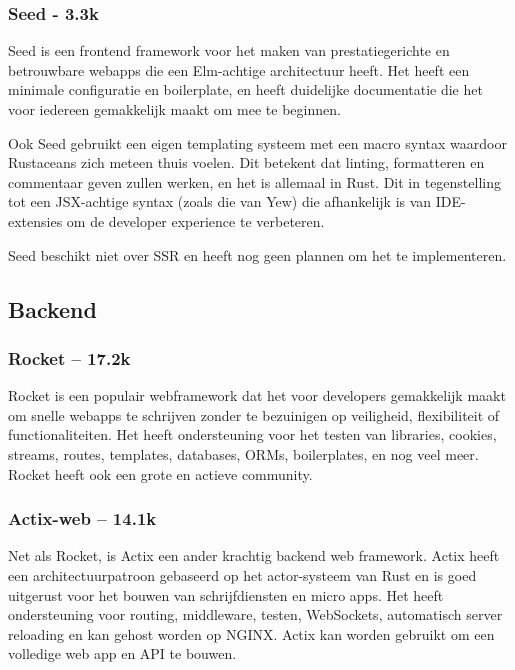\subsubsection{Seed - 3.3k}

Seed is een frontend framework voor het maken van prestatiegerichte en betrouwbare webapps die een
Elm-achtige architectuur heeft. Het heeft een minimale configuratie en boilerplate, en heeft
duidelijke documentatie die het voor iedereen gemakkelijk maakt om mee te beginnen.  

Ook Seed gebruikt een eigen templating systeem met een macro syntax waardoor Rustaceans zich meteen
thuis voelen. Dit betekent dat linting, formatteren en commentaar geven zullen werken, en het is
allemaal in Rust. Dit in tegenstelling tot een JSX-achtige syntax (zoals die van Yew) die
afhankelijk is van IDE-extensies om de developer experience te verbeteren. 

Seed beschikt niet over SSR en heeft nog geen plannen om het te implementeren. 

\subsection{Backend}

\subsubsection{Rocket – 17.2k}

Rocket is een populair webframework dat het voor developers gemakkelijk maakt om snelle webapps te
schrijven zonder te bezuinigen op veiligheid, flexibiliteit of functionaliteiten. Het heeft
ondersteuning voor het testen van libraries, cookies, streams, routes, templates, databases, ORMs,
boilerplates, en nog veel meer. Rocket heeft ook een grote en actieve community. 

\subsubsection{Actix-web – 14.1k}

Net als Rocket, is Actix een ander krachtig backend web framework. Actix heeft een
architectuurpatroon gebaseerd op het actor-systeem van Rust en is goed uitgerust voor het bouwen van
schrijfdiensten en micro apps. Het heeft ondersteuning voor routing, middleware, testen, WebSockets,
automatisch server reloading en kan gehost worden op NGINX. Actix kan worden gebruikt om een
volledige web app en API te bouwen. 

